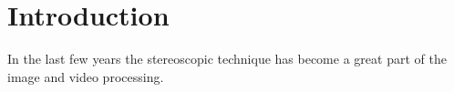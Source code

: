 \chapter{Introduction}
\label{intro}

In the last few years the stereoscopic technique has become a great part of the image and video processing.\\

